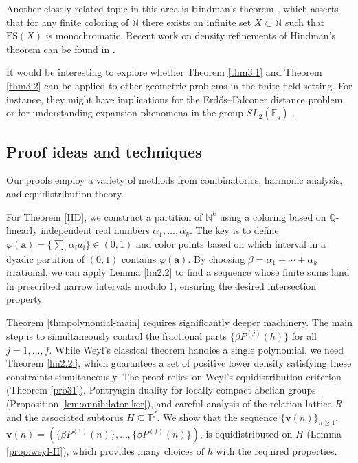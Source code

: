 \documentclass[11pt]{article}
\theoremstyle{definition}
\begin{document}
Another closely related topic in this area is Hindman's theorem \cite{Hind}, which asserts that for any finite coloring of $\mathbb{N}$ there exists an infinite set $X \subset \mathbb{N}$ such that $\mathrm{FS}(X)$ is monochromatic. Recent work on density refinements of Hindman's theorem can be found in \cite{HKR,Kra}.

It would be interesting to explore whether Theorem \ref{thm3.1} and Theorem \ref{thm3.2} can be applied to other geometric problems in the finite field setting. For instance, they might have implications for the Erdős–Falconer distance problem \cite{hart, IR} or for understanding expansion phenomena in the group $SL_2(\mathbb{F}_q)$ \cite{chapmanI, HH}.


\subsection{Proof ideas and techniques}

Our proofs employ a variety of methods from combinatorics, harmonic analysis, and equidistribution theory. 

For Theorem \ref{HD}, we construct a partition of $\mathbb{N}^k$ using a coloring based on $\mathbb{Q}$-linearly independent real numbers $\alpha_1, \ldots, \alpha_k$. The key is to define $\varphi(\mathbf{a}) = \{\sum_i \alpha_i a_i\} \in (0,1)$ and color points based on which interval in a dyadic partition of $(0,1)$ contains $\varphi(\mathbf{a})$. By choosing $\beta = \alpha_1 + \cdots + \alpha_k$ irrational, we can apply Lemma \ref{lm2.2} to find a sequence whose finite sums land in prescribed narrow intervals modulo $1$, ensuring the desired intersection property.

Theorem \ref{thmpolynomial-main} requires significantly deeper machinery. The main step is to simultaneously control the fractional parts $\{\beta P^{(j)}(h)\}$ for all $j = 1, \ldots, f$. While Weyl's classical theorem handles a single polynomial, we need Theorem \ref{lm2.2'}, which guarantees a set of positive lower density satisfying these constraints simultaneously. The proof relies on Weyl's equidistribution criterion (Theorem \ref{pro31}), Pontryagin duality for locally compact abelian groups (Proposition \ref{lem:annihilator-ker}), and careful analysis of the relation lattice $R$ and the associated subtorus $H \subseteq \mathbb{T}^f$. We show that the sequence $\{\mathbf{v}(n)\}_{n\ge 1}$, $\mathbf{v}(n)= (\{\beta P^{(1)}(n)\}, \ldots, \{\beta P^{(f)}(n)\})$, is equidistributed on $H$ (Lemma \ref{prop:weyl-H}), which provides many choices of $h$ with the required properties.
\end{document}
